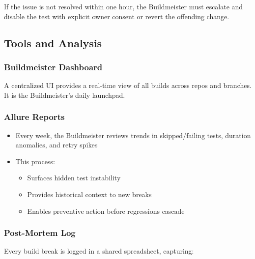 If the issue is not resolved within one hour, the Buildmeister must escalate
and disable the test with explicit owner consent or revert the offending change.

\subsection{Tools and Analysis}

\subsubsection{Buildmeister Dashboard}

A centralized UI provides a real-time view of all builds across repos and
branches. It is the Buildmeister's daily launchpad.

\subsubsection{Allure Reports}

\begin{itemize}
  \item Every week, the Buildmeister reviews trends in skipped/failing
    tests, duration anomalies, and retry spikes

  \item This process:

    \begin{itemize}
      \item Surfaces hidden test instability

      \item Provides historical context to new breaks

      \item Enables preventive action before regressions cascade
    \end{itemize}
\end{itemize}

\subsubsection{Post-Mortem Log}

Every build break is logged in a shared spreadsheet, capturing:

